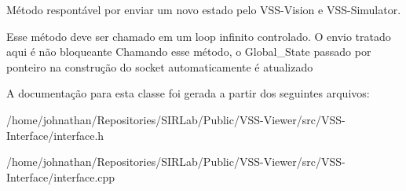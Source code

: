 Método respontável por enviar um novo estado pelo V\+S\+S-\/\+Vision e V\+S\+S-\/\+Simulator. 

Esse método deve ser chamado em um loop infinito controlado. O envio tratado aqui é não bloqueante Chamando esse método, o Global\+\_\+\+State passado por ponteiro na construção do socket automaticamente é atualizado 

A documentação para esta classe foi gerada a partir dos seguintes arquivos\+:\begin{DoxyCompactItemize}
\item 
/home/johnathan/\+Repositories/\+S\+I\+R\+Lab/\+Public/\+V\+S\+S-\/\+Viewer/src/\+V\+S\+S-\/\+Interface/interface.\+h\item 
/home/johnathan/\+Repositories/\+S\+I\+R\+Lab/\+Public/\+V\+S\+S-\/\+Viewer/src/\+V\+S\+S-\/\+Interface/interface.\+cpp\end{DoxyCompactItemize}
